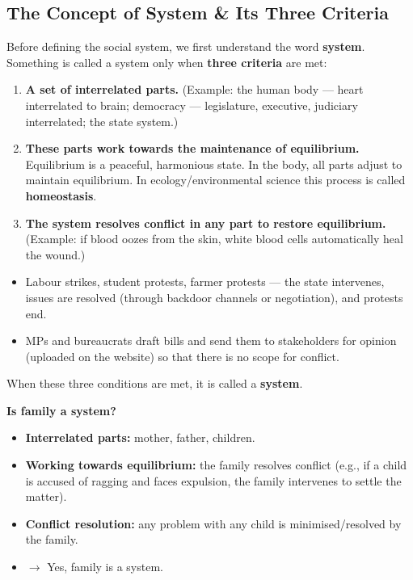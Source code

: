 \sectiondivider

\subsection{The Concept of System \& Its Three Criteria}

Before defining the social system, we first understand the word \textbf{system}. Something is called a system only when \textbf{three criteria} are met:

\begin{enumerate}
\item \textbf{A set of interrelated parts.} (Example: the human body --- heart interrelated to brain; democracy --- legislature, executive, judiciary interrelated; the state system.)
\item \textbf{These parts work towards the maintenance of equilibrium.} Equilibrium is a peaceful, harmonious state. In the body, all parts adjust to maintain equilibrium. In ecology/environmental science this process is called \textbf{homeostasis}.
\item \textbf{The system resolves conflict in any part to restore equilibrium.} (Example: if blood oozes from the skin, white blood cells automatically heal the wound.)
\end{enumerate}

\begin{ExampleBox}
\begin{itemize}
\item Labour strikes, student protests, farmer protests --- the state intervenes, issues are resolved (through backdoor channels or negotiation), and protests end.
\item MPs and bureaucrats draft bills and send them to stakeholders for opinion (uploaded on the website) so that there is no scope for conflict.
\end{itemize}
\end{ExampleBox}

When these three conditions are met, it is called a \textbf{system}.

\begin{ComparisonBox}
\textbf{Is family a system?}
\begin{itemize}
\item \textbf{Interrelated parts:} mother, father, children.
\item \textbf{Working towards equilibrium:} the family resolves conflict (e.g., if a child is accused of ragging and faces expulsion, the family intervenes to settle the matter).
\item \textbf{Conflict resolution:} any problem with any child is minimised/resolved by the family.
\item $\rightarrow$ Yes, family is a system.
\end{itemize}
\end{ComparisonBox}

